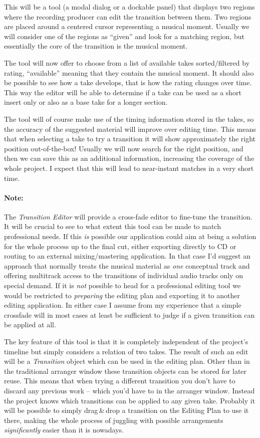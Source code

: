 \documentclass[11pt,a4paper]{article}
\begin{document}
This will be a tool (a modal dialog or a dockable panel) that displays two
regions where the recording producer can edit the transition between them.
Two regions are placed around a centered cursor representing a musical moment.
Usually we will consider one of the regions as “given” and look for a matching
region, but essentially the core of the transition is the musical moment.

The tool will now offer to choose from a list of available takes sorted/filtered
by rating, “available” meaning that they contain the musical moment.
It should also be possible to see how a take develops, that is how the rating
changes over time.
This way the editor will be able to determine if a take can be used as a short
insert only or also as a base take for a longer section.

The tool will of course make use of the timing information stored in the takes,
so the accuracy of the suggested material will improve over editing time.
This means that when selecting a take to try a transition it will show
approximately the right position out-of-the-box!
Usually we will now search for the right position, and then we can save this as
an additional information, increasing the coverage of the whole project.
I expect that this will lead to near-instant matches in a very short time.

\paragraph{Note:}
The \emph{Transition Editor} will provide a cross-fade editor to fine-tune the
transition.
It will be crucial to see to what extent this tool can be made to match
professional needs.
If this \emph{is} possible our application could aim at being a solution for the
whole process up to the final cut, either exporting directly to CD or routing to
an external mixing/mastering application.
In that case I'd suggest an approach that normally treats the musical material
as \emph{one} conceptual track and offering multitrack access to the transitions
of individual audio tracks only on special demand.
If it is \emph{not} possible to head for a professional editing tool we would be
restricted to \emph{preparing} the editing plan and exporting it to another
editing application.
In either case I assume from my experience that a simple crossfade will in most
cases at least be sufficient to judge if a given transition can be applied at
all.

\medskip
The key feature of this tool is that it is completely independent of the
project's timeline but simply considers a relation of two takes.
The result of such an edit will be a \emph{Transition} object which can be used
in the editing plan.
Other than in the traditional arranger window these transition objects can be
stored for later reuse.
This means that when trying a different transition you don't have to discard any
previous work -- which you'd have to in the arranger window.
Instead the project knows which transitions can be applied to any given take.
Probably it will be possible to simply drag\,\&\,drop a transition on the
Editing Plan to use it there, making the whole process of juggling with possible
arrangements \emph{significantly} easier than it is nowadays.
\end{document}
